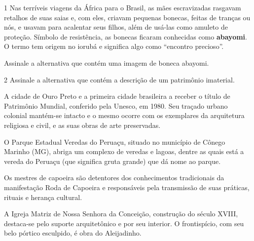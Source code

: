
\num{1}  Nas terríveis viagens da África para o Brasil, as mães escravizadas
rasgavam retalhos de suas saias e, com eles, criavam pequenas bonecas, feitas
de tranças ou nós, e usavam para acalentar seus filhos, além de usá-las como
amuleto de proteção. Símbolo de resistência, as bonecas ficaram conhecidas
como \textbf{abayomi}. O termo tem origem no iorubá e significa algo como
“encontro precioso”.

Assinale a alternativa que contém uma imagem de boneca abayomi.
%
%
%
%
%
%


\num{2}  Assinale a alternativa que contém a descrição de um patrimônio imaterial.

\begin{escolha}
\item
  A cidade de Ouro Preto e a primeira cidade brasileira a receber o
  título de Patrimônio Mundial, conferido pela Unesco, em 1980. Seu
  traçado urbano colonial mantém-se intacto e o mesmo ocorre com os
  exemplares da arquitetura religiosa e civil, e as suas obras de arte
  preservadas.
\item
  O Parque Estadual Veredas do Peruaçu, situado no município de Cônego
  Marinho (MG), abriga um complexo de veredas e lagoas, dentre as quais
  está a vereda do Peruaçu (que significa gruta grande) que dá nome ao
  parque.
\item
  Os mestres de capoeira são detentores dos conhecimentos tradicionais
  da manifestação Roda de Capoeira e responsáveis pela transmissão de
  suas práticas, rituais e herança cultural.
\item
  A Igreja Matriz de Nossa Senhora da Conceição, construção do século
  XVIII, destaca-se pelo suporte arquitetônico e por seu interior. O
  frontispício, com seu belo pórtico esculpido, é obra do Aleijadinho.
\end{escolha}


